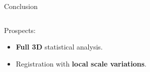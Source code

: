 \documentclass[10pt]{beamer}
\begin{document}
\begin{frame}{Conclusion}
\begin{columns}
\begin{column}{.2\textwidth}
    \end{column}
  \end{columns}

 


  \vspace{0.2cm}

  Prospects:
  \begin{itemize}
  \item \textbf{Full 3D} statistical analysis.
  \item Registration with \textbf{local scale variations}.
  \end{itemize}



\end{frame}

\section{}
\end{document}
